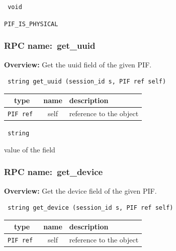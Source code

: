 \vspace{0.3cm}

{\tt 
void
}



\vspace{0.3cm}

 {\tt PIF\_IS\_PHYSICAL}

\vspace{0.6cm}
\subsubsection{RPC name:~get\_uuid}

{\bf Overview:} 
Get the uuid field of the given PIF.

\begin{verbatim} string get_uuid (session_id s, PIF ref self)\end{verbatim}



 
\vspace{0.3cm}
\begin{tabular}{|c|c|p{7cm}|}
 \hline
{\bf type} & {\bf name} & {\bf description} \\ \hline
{\tt PIF ref } & self & reference to the object \\ \hline 

\end{tabular}

\vspace{0.3cm}

{\tt 
string
}


value of the field
\vspace{0.3cm}
\vspace{0.3cm}
\vspace{0.3cm}
\subsubsection{RPC name:~get\_device}

{\bf Overview:} 
Get the device field of the given PIF.

\begin{verbatim} string get_device (session_id s, PIF ref self)\end{verbatim}



 
\vspace{0.3cm}
\begin{tabular}{|c|c|p{7cm}|}
 \hline
{\bf type} & {\bf name} & {\bf description} \\ \hline
{\tt PIF ref } & self & reference to the object \\ \hline 

\end{tabular}

